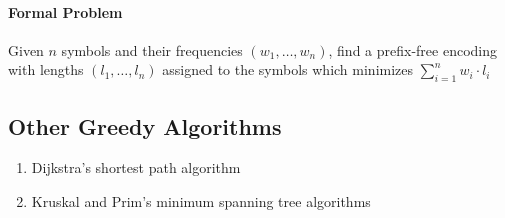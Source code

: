 \documentclass[11pt]{article}
\begin{document}
\paragraph{Formal Problem}
Given $n$ symbols and their frequencies $(w_1, \hdots, w_n)$, find a prefix-free encoding with lengths $(l_1, \hdots, l_n)$ assigned to the symbols which minimizes $\sum_{i=1}^n w_i \cdot l_i$


\subsection{Other Greedy Algorithms}
\begin{enumerate}
	\item Dijkstra's shortest path algorithm
	\item Kruskal and Prim's minimum spanning tree algorithms
\end{enumerate}
\end{document}
